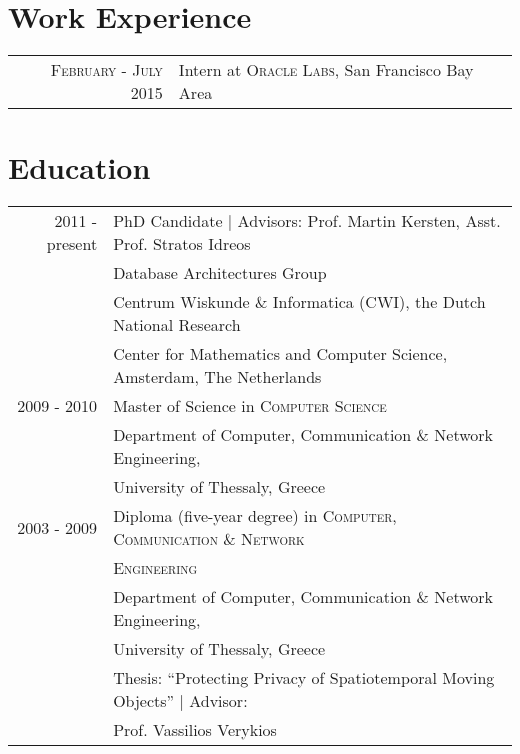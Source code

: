 \documentclass[a4paper,10pt]{article}
\begin{document}
\section{Work Experience}
\begin{tabular}{r|p{11cm}}
\textsc{February - July 2015} & Intern at \textsc{Oracle Labs}, San Francisco Bay Area\\
\end{tabular}

\section{Education}
\begin{tabular}{rl}	
2011 - present & PhD Candidate | \small Advisors: Prof. Martin Kersten, Asst. Prof. Stratos Idreos\\
            & Database Architectures Group\\
            & Centrum Wiskunde $\&$ Informatica (CWI), the Dutch National Research \\
            & Center for Mathematics and Computer Science, Amsterdam, The Netherlands\\
2009 - 2010 & Master of Science in \textsc{Computer Science}\\
            & Department of Computer, Communication  $\&$ Network Engineering,\\ 
            &University of Thessaly, Greece\\
2003 - 2009 & Diploma (five-year degree) in \textsc{Computer, Communication $\&$ Network} \\
            & \textsc{Engineering}\\
            &Department of Computer, Communication  $\&$ Network Engineering,\\ 
            &University of Thessaly, Greece\\
& Thesis: ``Protecting Privacy of Spatiotemporal Moving Objects''  | \small Advisor:\\
            &Prof. Vassilios Verykios\\
\end{tabular}


\end{document}
